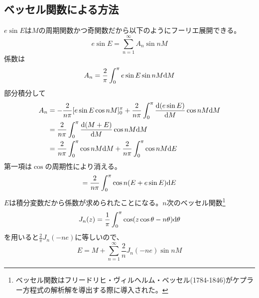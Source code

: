 	\subsection{ベッセル関数による方法}
		$e\sin E$は$M$の周期関数かつ奇関数だから以下のようにフーリエ展開できる。
			\[e\sin E = \sum_{n=1}^\infty A_n\sin nM\]
		係数は
			\[A_n = \frac{2}{\pi}\int_0^\pi e\sin E\sin nM \d M\]
		部分積分して
		\begin{align*}
			A_n &= - \frac{2}{n\pi}[e\sin E\cos nM ]_0^\pi + \frac{2}{n\pi}\int_0^\pi \de[(e\sin E)]{M}\cos nM \d M\\
			&= \frac{2}{n\pi}\int_0^\pi \de[(M + E)]{M}\cos nM \d M\\
			&= \frac{2}{n\pi}\int_0^\pi \cos nM \d M + \frac{2}{n\pi}\int_0^\pi \cos nM \d E
		\end{align*}
		第一項は$\cos$の周期性により消える。
		\begin{align*}
			= \frac{2}{n\pi}\int_0^\pi \cos n(E + e\sin E) \d E
		\end{align*}
		$E$は積分変数だから係数が求められたことになる。$n$次のベッセル関数\footnote{ベッセル関数はフリードリヒ・ヴィルヘルム・ベッセル(1784-1846)がケプラー方程式の解析解を導出する際に導入された。}
			\[J_n(z) = \frac{1}{\pi}\int_0^\pi \cos(z\cos\theta - n\theta)\d \theta\]
		を用いると$\frac{2}{\pi}J_n(-ne)$に等しいので、
			\[E = M + \sum_{n=1}^\infty \frac{2}{n}J_n(-ne)\sin nM\]
